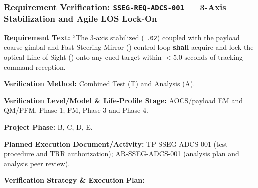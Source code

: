 \subsubsection{Requirement Verification: \texttt{SSEG-REQ-ADCS-001} --- 3-Axis Stabilization and Agile LOS Lock-On}
\label{ver:SSEG-REQ-ADCS-001}
\textbf{Requirement Text:} ``The 3-axis stabilized  ( \texttt{.02}) coupled with the payload coarse gimbal and Fast Steering Mirror () control loop \textbf{shall} acquire and lock the optical Line of Sight () onto any cued target within $< 5.0\text{ seconds}$ of tracking command reception.
\par\textbf{Verification Method:} Combined Test (T) and Analysis (A).
\par\textbf{Verification Level/Model \& Life-Profile Stage:} AOCS/payload EM and QM/PFM, Phase 1; FM, Phase 3 and Phase 4.
\par\textbf{Project Phase:} B, C, D, E.
\par\textbf{Planned Execution Document/Activity:} TP-SSEG-ADCS-001 (test procedure and TRR authorization); AR-SSEG-ADCS-001 (analysis plan and analysis peer review).
\par\textbf{Verification Strategy \& Execution Plan:}
